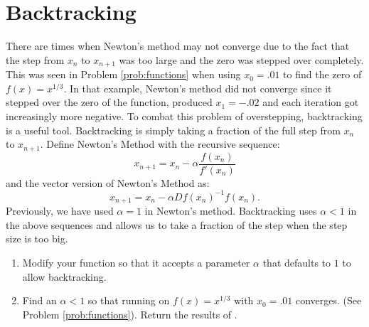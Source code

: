 \section*{Backtracking}
There are times when Newton's method may not converge due to the fact that the step from $x_n$ to $x_{n+1}$ was too large and the zero was stepped over completely.  This was seen in Problem \ref{prob:functions} when using $x_0 = .01$ to find the zero of $f(x)=x^{1/3}$. In that example, Newton's method did not converge since it stepped over the zero of the function, produced $x_1 = -.02$ and each iteration got increasingly more negative.  To combat this problem of overstepping, backtracking is a useful tool.  Backtracking is simply taking a fraction of the full step from $x_n$ to $x_{n+1}$.  Define Newton's Method with the recursive sequence:
\[
x_{n+1} = x_n - \alpha\frac{f(x_n)}{f'(x_n)}
\]
and the vector version of Newton's Method as:
\[
x_{n+1} = x_n - \alpha{Df(x_n)}^{-1}{f(x_n)}.
\]
Previously, we have used $\alpha = 1$ in Newton's method.  Backtracking uses $\alpha < 1$ in the above sequences and allows us to take a fraction of the step when the step size is too big.
\begin{problem}
\begin{enumerate}

\item Modify your  function so that it accepts a parameter $\alpha$ that defaults to $1$ to allow backtracking.
\item Find an $\alpha < 1$ so that running  on $f(x)=x^{1/3}$ with $x_0=.01$ converges.  
(See Problem \ref{prob:functions}).
Return the results of .


\end{enumerate}
\end{problem}


